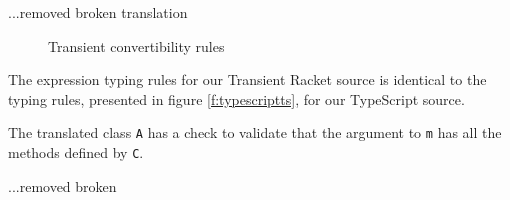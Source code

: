 \documentclass[acmlarge, anonymous, authordraft, review]{acmart} %
\newcommand{\code}[1]{{\tt #1}\xspace}
\begin{document}
...removed broken translation 

\begin{figure}
\hrulefill
\begin{mathpar}




\end{mathpar}
\hrulefill
\caption{Transient convertibility rules}\label{f:transientts}
\end{figure}

The expression typing rules for our Transient Racket source is identical to the 
typing rules, presented in figure \ref{f:typescriptts}, for our TypeScript source.

\noindent The translated class \code A has a check to validate that the
argument to \code m has all the methods defined by \code C.

...removed broken
\end{document}
